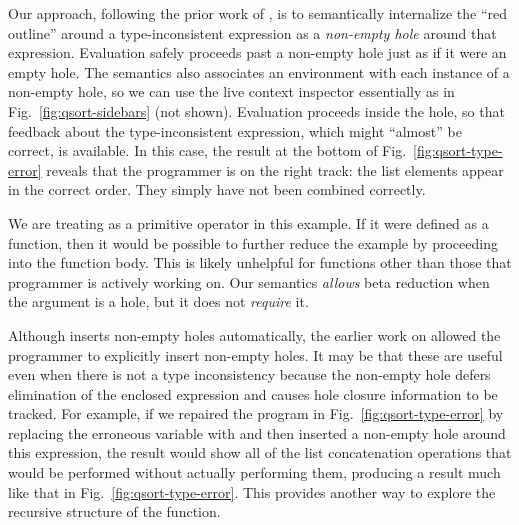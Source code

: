 Our approach, following the prior work of \citet{popl-paper}, 
is to semantically internalize the ``red outline'' around
a type-inconsistent expression as a \emph{non-empty hole} around that expression.
Evaluation safely proceeds past a non-empty hole just as if it were an empty hole.
The semantics also associates an environment with each instance of a non-empty hole,
so we can use the live context inspector essentially as in Fig.~\ref{fig:qsort-sidebars} (not shown). 
Evaluation proceeds inside the hole, so that 
feedback about the type-inconsistent expression, which might ``almost'' be correct, is available. 
In this case, the result at the bottom of Fig.~\ref{fig:qsort-type-error}
reveals that the programmer is on the right track: the list elements 
appear in the correct order.
They simply have not been combined correctly.

We are treating  as a primitive operator in this example. If it were defined as a function, then
it would be possible to further reduce the example by proceeding into the function body. This is likely unhelpful for
functions other than those that programmer is actively working on. Our semantics \emph{allows} beta reduction when the argument is a hole, but it does not \emph{require} it.

Although \Hazel inserts non-empty holes automatically, the earlier work on \Hazelnut allowed the programmer to explicitly insert non-empty holes. It may be that these are useful even when there is not a type inconsistency because the non-empty hole defers elimination of the enclosed expression and causes hole closure information to be tracked. For example, if we repaired the program in Fig.~\ref{fig:qsort-type-error} by replacing the erroneous variable  with \li{[pivot]} and then inserted a non-empty hole around this expression, the result would show all of the list concatenation operations that would be performed without actually performing them, producing a result much like that in Fig.~\ref{fig:qsort-type-error}. This provides another way to explore the recursive structure of the  function.





